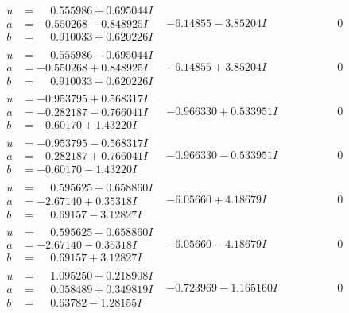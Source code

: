\documentclass[1p]{elsarticle_modified}
\theoremstyle{definition}
\begin{document}
$$\begin{array}{c|c|c}
\begin{aligned}
u &= \phantom{-}0.555986 + 0.695044 I \\
a &= -0.550268 - 0.848925 I \\
b &= \phantom{-}0.910033 + 0.620226 I\end{aligned}
 & -6.14855 - 3.85204 I & \phantom{-0.000000 } 0 \\ \hline\begin{aligned}
u &= \phantom{-}0.555986 - 0.695044 I \\
a &= -0.550268 + 0.848925 I \\
b &= \phantom{-}0.910033 - 0.620226 I\end{aligned}
 & -6.14855 + 3.85204 I & \phantom{-0.000000 } 0 \\ \hline\begin{aligned}
u &= -0.953795 + 0.568317 I \\
a &= -0.282187 - 0.766041 I \\
b &= -0.60170 + 1.43220 I\end{aligned}
 & -0.966330 + 0.533951 I & \phantom{-0.000000 } 0 \\ \hline\begin{aligned}
u &= -0.953795 - 0.568317 I \\
a &= -0.282187 + 0.766041 I \\
b &= -0.60170 - 1.43220 I\end{aligned}
 & -0.966330 - 0.533951 I & \phantom{-0.000000 } 0 \\ \hline\begin{aligned}
u &= \phantom{-}0.595625 + 0.658860 I \\
a &= -2.67140 + 0.35318 I \\
b &= \phantom{-}0.69157 - 3.12827 I\end{aligned}
 & -6.05660 + 4.18679 I & \phantom{-0.000000 } 0 \\ \hline\begin{aligned}
u &= \phantom{-}0.595625 - 0.658860 I \\
a &= -2.67140 - 0.35318 I \\
b &= \phantom{-}0.69157 + 3.12827 I\end{aligned}
 & -6.05660 - 4.18679 I & \phantom{-0.000000 } 0 \\ \hline\begin{aligned}
u &= \phantom{-}1.095250 + 0.218908 I \\
a &= \phantom{-}0.058489 + 0.349819 I \\
b &= \phantom{-}0.63782 - 1.28155 I\end{aligned}
 & -0.723969 - 1.165160 I & \phantom{-0.000000 } 0 \\ \hline\begin{aligned}

\end{aligned}
\end{array}$$
\end{document}
